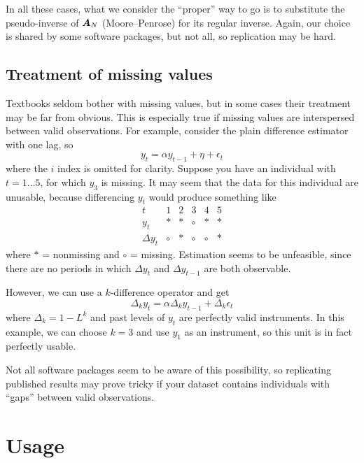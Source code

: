 In all these cases, what we consider the ``proper'' way to go is to
substitute the pseudo-inverse of $\boldsymbol{A}_N$ (Moore--Penrose) for its regular
inverse. Again, our choice is shared by some software packages, but
not all, so replication may be hard.


\subsection{Treatment of missing values}

Textbooks seldom bother with missing values, but in some cases their
treatment may be far from obvious. This is especially true if missing
values are interspersed between valid observations. For example,
consider the plain difference estimator with one lag, so
\[
y_t = \alpha y_{t-1} + \eta + \epsilon_t
\]
where the $i$ index is omitted for clarity. Suppose you have an
individual with $t=1\ldots5$, for which $y_3$ is missing. It may seem
that the data for this individual are unusable, because
differencing $y_t$ would produce something like
\[
\begin{array}{c|ccccc}
  t & 1 & 2 & 3 & 4 & 5 \\
  \hline
  y_t & * & * & \circ & * & * \\
  \Delta y_t & \circ & * & \circ & \circ & *
\end{array}
\]
where $*$ = nonmissing and $\circ$ = missing. Estimation seems to be
unfeasible, since there are no periods in which $\Delta y_t$ and
$\Delta y_{t-1}$ are both observable.

However, we can use a $k$-difference operator and get
\[
\Delta_k y_t = \alpha \Delta_k y_{t-1} + \Delta_k \epsilon_t
\]
where $\Delta_k = 1 - L^k$ and past levels of $y_t$ are perfectly
valid instruments. In this example, we can choose $k=3$ and use $y_1$
as an instrument, so this unit is in fact perfectly usable.

Not all software packages seem to be aware of this possibility, so
replicating published results may prove tricky if your dataset
contains individuals with ``gaps'' between valid observations.

\section{Usage}

